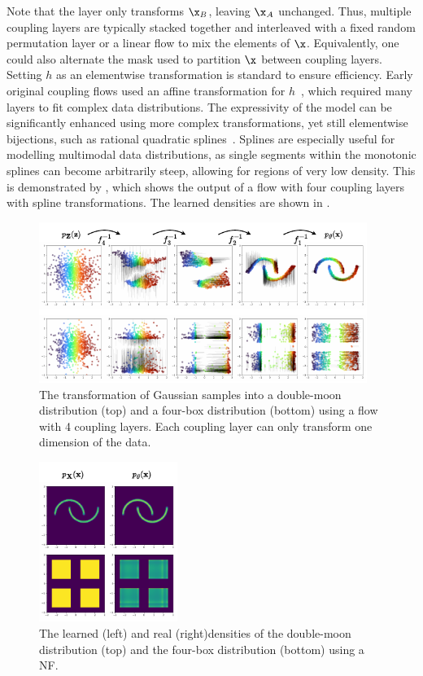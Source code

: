 Note that the layer only transforms $\x_B$, leaving $\x_A$ unchanged.
Thus, multiple coupling layers are typically stacked together and interleaved with a fixed random permutation layer or a linear flow to mix the elements of $\x$.
Equivalently, one could also alternate the mask used to partition $\x$ between coupling layers.
Setting $h$ as an elementwise transformation is standard to ensure efficiency.
Early original coupling flows used an affine transformation for $h$~\cite{RealNVP}, which required many layers to fit complex data distributions.
The expressivity of the model can be significantly enhanced using more complex transformations, yet still elementwise bijections, such as rational quadratic splines~\cite{NeuralSplineFlows}.
Splines are especially useful for modelling multimodal data distributions, as single segments within the monotonic splines can become arbitrarily steep, allowing for regions of very low density.
This is demonstrated by , which shows the output of a flow with four coupling layers with spline transformations.
The learned densities are shown in .

\begin{figure}[ht]
    \centering
    \includegraphics[width=0.95\textwidth]{Figures/generative_models/samples.pdf}
    \caption{The transformation of Gaussian samples into a double-moon distribution (top) and a four-box distribution (bottom) using a flow with 4 coupling layers. Each coupling layer can only transform one dimension of the data.}
    \label{fig:samples}
\end{figure}

\begin{figure}[ht]
    \centering
    \includegraphics[width=0.4\textwidth]{Figures/generative_models/densities.pdf}
    \caption{The learned (left) and real (right)densities of the double-moon distribution (top) and the four-box distribution (bottom) using a NF.}
    \label{fig:density}
\end{figure}

